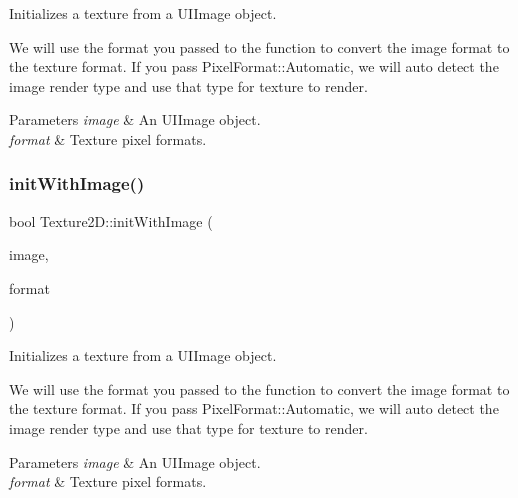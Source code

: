 Initializes a texture from a U\+I\+Image object.

We will use the format you passed to the function to convert the image format to the texture format. If you pass Pixel\+Format\+::\+Automatic, we will auto detect the image render type and use that type for texture to render. 
\begin{DoxyParams}{Parameters}
{\em image} & An U\+I\+Image object. \\
\hline
{\em format} & Texture pixel formats. \\
\hline
\end{DoxyParams}
\mbox{\label{classTexture2D_a52292343ab1e6f4f3e20d35181d98b5f}} 
\subsubsection{\texorpdfstring{init\+With\+Image()}{initWithImage()}\hspace{0.1cm}{\footnotesize\ttfamily [4/4]}}
{\footnotesize\ttfamily bool Texture2\+D\+::init\+With\+Image (\begin{DoxyParamCaption}\item[{Image $\ast$}]{image,  }\item[{\hyperlink{classTexture2D_a45d9d8bb5a0669def36bbdfbfb91d220}{Pixel\+Format}}]{format }\end{DoxyParamCaption})}

Initializes a texture from a U\+I\+Image object.

We will use the format you passed to the function to convert the image format to the texture format. If you pass Pixel\+Format\+::\+Automatic, we will auto detect the image render type and use that type for texture to render. 
\begin{DoxyParams}{Parameters}
{\em image} & An U\+I\+Image object. \\
\hline
{\em format} & Texture pixel formats. \\
\hline
\end{DoxyParams}
\mbox{\label{classTexture2D_ae57b9e38403f115d0959308ec653a8b0}} 
